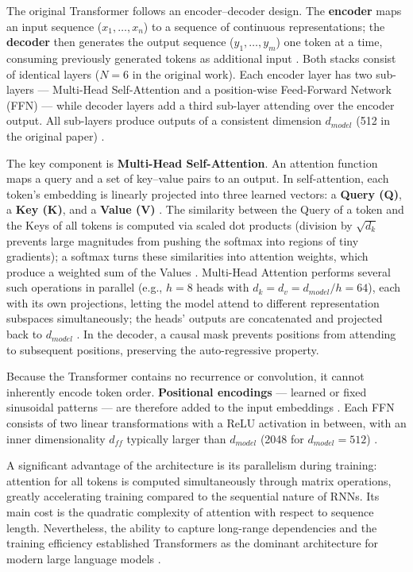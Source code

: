 The original Transformer follows an encoder--decoder design. The \textbf{encoder} maps an input sequence ($x_1, \ldots, x_n$) to a sequence of continuous representations; the \textbf{decoder} then generates the output sequence ($y_1, \ldots, y_m$) one token at a time, consuming previously generated tokens as additional input \cite{jm3_llm_book}. Both stacks consist of identical layers ($N=6$ in the original work). Each encoder layer has two sub-layers --- Multi-Head Self-Attention and a position-wise Feed-Forward Network (FFN) --- while decoder layers add a third sub-layer attending over the encoder output. All sub-layers produce outputs of a consistent dimension $d_{model}$ (512 in the original paper) \cite{vaswani2017_attention_is_all}.

The key component is \textbf{Multi-Head Self-Attention}. An attention function maps a query and a set of key--value pairs to an output. In self-attention, each token's embedding is linearly projected into three learned vectors: a \textbf{Query (Q)}, a \textbf{Key (K)}, and a \textbf{Value (V)} \cite{vaswani2017_attention_is_all}. The similarity between the Query of a token and the Keys of all tokens is computed via scaled dot products (division by $\sqrt{d_k}$ prevents large magnitudes from pushing the softmax into regions of tiny gradients); a softmax turns these similarities into attention weights, which produce a weighted sum of the Values \cite{jm3_llm_book, vaswani2017_attention_is_all}. Multi-Head Attention performs several such operations in parallel (e.g., $h=8$ heads with $d_k=d_v=d_{model}/h=64$), each with its own projections, letting the model attend to different representation subspaces simultaneously; the heads' outputs are concatenated and projected back to $d_{model}$ \cite{vaswani2017_attention_is_all}. In the decoder, a causal mask prevents positions from attending to subsequent positions, preserving the auto-regressive property.

Because the Transformer contains no recurrence or convolution, it cannot inherently encode token order. \textbf{Positional encodings} --- learned or fixed sinusoidal patterns --- are therefore added to the input embeddings \cite{jm3_llm_book, vaswani2017_attention_is_all}. Each FFN consists of two linear transformations with a ReLU activation in between, with an inner dimensionality $d_{ff}$ typically larger than $d_{model}$ (2048 for $d_{model}=512$) \cite{jm3_llm_book}.

A significant advantage of the architecture is its parallelism during training: attention for all tokens is computed simultaneously through matrix operations, greatly accelerating training compared to the sequential nature of RNNs. Its main cost is the quadratic complexity of attention with respect to sequence length. Nevertheless, the ability to capture long-range dependencies and the training efficiency established Transformers as the dominant architecture for modern large language models \cite{jm3_llm_book}.

